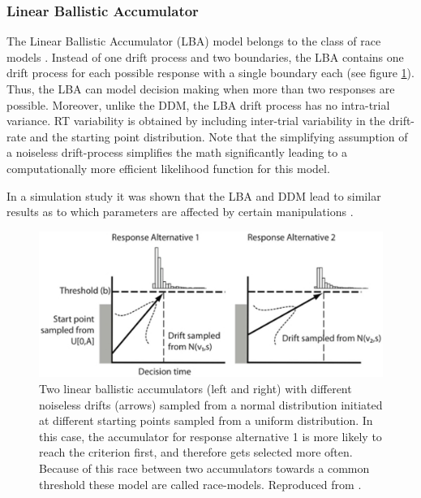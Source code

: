 \documentclass[letterpaper,10pt,english]{article}
\begin{document}
\subsubsection*{Linear Ballistic Accumulator}
\label{methods:linear-ballistic-accumulator}
The Linear Ballistic Accumulator (LBA) model belongs to the class of race models \citep{BrownHeathcote08}. Instead of one drift process and two boundaries, the LBA contains one drift process for each possible response with a single boundary each (see figure \ref{fig.lba}). Thus, the LBA can model decision making when more than two responses are possible. Moreover, unlike the DDM, the LBA drift process has no intra-trial variance. RT variability is obtained by including inter-trial variability in the drift-rate and the starting point distribution. Note that the simplifying assumption of a noiseless drift-process simplifies the math significantly leading to a computationally more efficient likelihood function for this model.

In a simulation study it was shown that the LBA and DDM lead to
similar results as to which parameters are affected by certain
manipulations \citep{DonkinBrownHeathcoteEtAl11}.
\begin{figure}[htbp]
\centering
\capstart

\includegraphics[scale=.6]{lba.png}
\caption{Two linear ballistic accumulators (left and right) with   different noiseless drifts (arrows) sampled from a normal   distribution initiated at different starting points sampled from a   uniform distribution. In this case, the accumulator for response   alternative 1 is more likely to reach the criterion first, and   therefore gets selected more often. Because of this race between two   accumulators towards a common threshold these model are called   race-models. Reproduced from   \citep{DonkinBrownHeathcoteEtAl11}.}
\label{fig.lba}
\end{figure}
\end{document}
